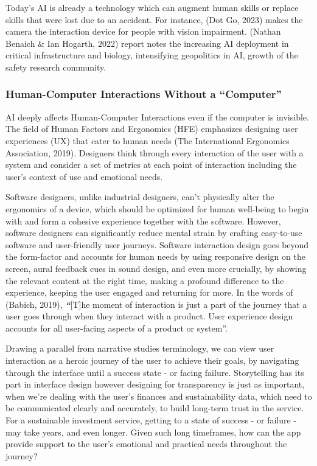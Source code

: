 \documentclass[
  letterpaper,
  DIV=11,
  numbers=noendperiod]{scrartcl}
\begin{document}
Today's AI is already a technology which can augment human skills or
replace skills that were lost due to an accident. For instance, (Dot Go,
2023) makes the camera the interaction device for people with vision
impairment. (Nathan Benaich \& Ian Hogarth, 2022) report notes the
increasing AI deployment in critical infrastructure and biology,
intensifying geopolitics in AI, growth of the safety research community.

\subsubsection{Human-Computer Interactions Without a
``Computer''}\label{human-computer-interactions-without-a-computer}

AI deeply affects Human-Computer Interactions even if the computer is
invisible. The field of Human Factors and Ergonomics (HFE) emphasizes
designing user experiences (UX) that cater to human needs (The
International Ergonomics Association, 2019). Designers think through
every interaction of the user with a system and consider a set of
metrics at each point of interaction including the user's context of use
and emotional needs.

Software designers, unlike industrial designers, can't physically alter
the ergonomics of a device, which should be optimized for human
well-being to begin with and form a cohesive experience together with
the software. However, software designers can significantly reduce
mental strain by crafting easy-to-use software and user-friendly user
journeys. Software interaction design goes beyond the form-factor and
accounts for human needs by using responsive design on the screen, aural
feedback cues in sound design, and even more crucially, by showing the
relevant content at the right time, making a profound difference to the
experience, keeping the user engaged and returning for more. In the
words of (Babich, 2019), \textbf{\emph{``}}{[}T{]}he moment of
interaction is just a part of the journey that a user goes through when
they interact with a product. User experience design accounts for all
user-facing aspects of a product or system''.

Drawing a parallel from narrative studies terminology, we can view user
interaction as a heroic journey of the user to achieve their goals, by
navigating through the interface until a success state - or facing
failure. Storytelling has its part in interface design however designing
for transparency is just as important, when we're dealing with the
user's finances and sustainability data, which need to be communicated
clearly and accurately, to build long-term trust in the service. For a
sustainable investment service, getting to a state of success - or
failure - may take years, and even longer. Given such long timeframes,
how can the app provide support to the user's emotional and practical
needs throughout the journey?
\end{document}
